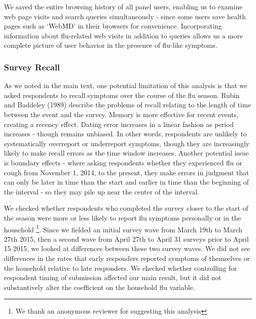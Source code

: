 \documentclass[12pt]{article}
\begin{document}
We saved the entire browsing history of all panel users, enabling us to examine web page visits and search queries simultaneously - since some users save health pages such as `WebMD' in their browsers for convenience. Incorporating information about flu-related web visits in addition to queries allows us a more complete picture of user behavior in the presence of flu-like symptoms.  

\subsubsection{Survey Recall}

As we noted in the main text, one potential limitation of this analysis is that we asked respondents to recall symptoms over the course of the flu season. Rubin and Baddeley (1989) describe the problems of recall relating to the length of time between the event and the survey. Memory is more effective for recent events, creating a recency effect. Dating error increases in a linear fashion as period increases - though remains unbiased. In other words, respondents are unlikely to systematically overreport or underreport symptoms, though they are increasingly likely to make recall errors as the time window increases. Another potential issue is boundary effects - where asking respondents whether they experienced flu or cough from November 1, 2014, to the present, they make errors in judgment that can only be later in time than the start and earlier in time than the beginning of the interval - so they may pile up near the center of the interval. 

We checked whether respondents who completed the survey closer to the start of the season were more or less likely to report flu symptoms personally or in the household \footnote{We thank an anonymous reviewer for suggesting this analysis}. Since we fielded an initial survey wave from March 19th to March 27th 2015, then a second wave from April 27th to April 31 surveys prior to April 15 2015, we looked at differences between these two survey waves. We did not see differences in the rates that early responders reported symptoms of themselves or the household relative to late responders. We checked whether controlling for respondent timing of submission affected our main result, but it did not substantively alter the coefficient on the household flu variable. 
\end{document}

